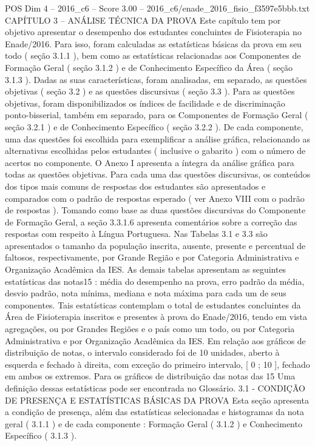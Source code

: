 \begin{textsample}{POS Dim 4 – 2016\_c6 – Score 3.00 – 2016\_c6/enade\_2016\_fisio\_f3597e5bbb.txt}  \label{ex:f4_pos_060}
CAPÍTULO 3 – ANÁLISE TÉCNICA DA PROVA Este capítulo tem por objetivo apresentar o desempenho dos estudantes concluintes de Fisioterapia no Enade/2016.
Para isso, foram calculadas as estatísticas básicas da prova em seu todo ( seção 3.1.1 ), bem como as estatísticas relacionadas aos Componentes de Formação Geral ( seção 3.1.2 ) e de Conhecimento Específico da Área ( seção 3.1.3 ).
Dadas as suas características, foram analisadas, em separado, as questões objetivas ( seção 3.2 ) e as questões discursivas ( seção 3.3 ).
Para as questões objetivas, foram disponibilizados os índices de facilidade e de discriminação ponto-bisserial, também em separado, para os Componentes de Formação Geral ( seção 3.2.1 ) e de Conhecimento Específico ( seção 3.2.2 ).
De cada componente, uma das questões foi escolhida para exemplificar a análise gráfica, relacionando as alternativas escolhidas pelos estudantes ( inclusive o gabarito ) com o número de acertos no componente.
O Anexo I apresenta a íntegra da análise gráfica para todas as questões objetivas.
Para cada uma das questões discursivas, os conteúdos dos tipos mais comuns de respostas dos estudantes são apresentados e comparados com o padrão de respostas esperado ( ver Anexo VIII com o padrão de respostas ).
Tomando como base as duas questões discursivas do Componente de Formação Geral, a seção 3.3.1.6 apresenta comentários sobre a correção das respostas com respeito à Língua Portuguesa.
Nas Tabelas 3.1 e 3.3 são apresentados o tamanho da população inscrita, ausente, presente e percentual de faltosos, respectivamente, por Grande Região e por Categoria Administrativa e Organização Acadêmica da IES.
As demais tabelas apresentam as seguintes estatísticas das notas15 : média do desempenho na prova, erro padrão da média, desvio padrão, nota mínima, mediana e nota máxima para cada um de seus componentes.
Tais estatísticas contemplam o total de estudantes concluintes da Área de Fisioterapia inscritos e presentes à prova do Enade/2016, tendo em vista agregações, ou por Grandes Regiões e o país como um todo, ou por Categoria Administrativa e por Organização Acadêmica da IES.
Em relação aos gráficos de distribuição de notas, o intervalo considerado foi de 10 unidades, aberto à esquerda e fechado à direita, com exceção do primeiro intervalo, [ 0 ; 10 ], fechado em ambos os extremos.
Para os gráficos de distribuição das notas das 15 Uma definição dessas estatísticas pode ser encontrada no Glossário. 3.1 - CONDIÇÃO DE PRESENÇA E ESTATÍSTICAS BÁSICAS DA PROVA Esta seção apresenta a condição de presença, além das estatísticas selecionadas e histogramas da nota geral ( 3.1.1 ) e de cada componente : Formação Geral ( 3.1.2 ) e Conhecimento Específico ( 3.1.3 ).

\end{textsample}
